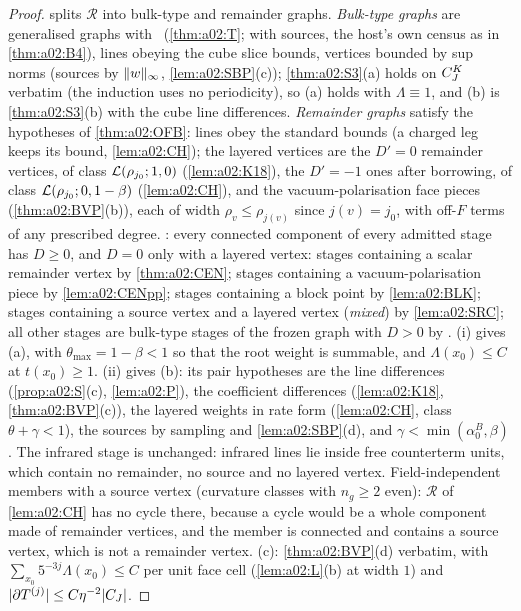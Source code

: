 \begin{proof}
 splits $\mathcal R$ into bulk-type and remainder graphs. \emph{Bulk-type graphs} are generalised graphs with \DEG\ (\cref{thm:a02:T}; with sources, the host's own census as in \cref{thm:a02:B4}), lines obeying the cube slice bounds, vertices bounded by sup norms (sources by $\lVert w\rVert_\infty$, \cref{lem:a02:SBP}(c)); \cref{thm:a02:S3}(a) holds on $C^{K}_{J}$ verbatim (the induction uses no periodicity), so (a) holds with $\Lambda\equiv1$, and (b) is \cref{thm:a02:S3}(b) with the cube line differences. \emph{Remainder graphs} satisfy the hypotheses of \cref{thm:a02:OFB}: lines obey the standard bounds (a charged leg keeps its bound, \cref{lem:a02:CH}); the layered vertices are the $D'=0$ remainder vertices, of class $\mathcal L(\rho_{j_0};1,0)$ (\cref{lem:a02:K18}), the $D'=-1$ ones after borrowing, of class $\mathcal L(\rho_{j_0};0,1-\beta)$ (\cref{lem:a02:CH}), and the vacuum-polarisation face pieces (\cref{thm:a02:BVP}(b)), each of width $\rho_v\le\rho_{j(v)}$ since $j(v)=j_0$, with off-$F$ terms of any prescribed degree. \DEGB: every connected component of every admitted stage has $D\ge0$, and $D=0$ only with a layered vertex: stages containing a scalar remainder vertex by \cref{thm:a02:CEN}; stages containing a vacuum-polarisation piece by \cref{lem:a02:CENpp}; stages containing a block point by \cref{lem:a02:BLK}; stages containing a source vertex and a layered vertex (\emph{mixed}) by \cref{lem:a02:SRC}; all other stages are bulk-type stages of the frozen graph with $D>0$ by \DEG. (i) gives (a), with $\theta_{\max}=1-\beta<1$ so that the root weight is summable, and $\Lambda(x_0)\le C$ at $t(x_0)\ge1$. (ii) gives (b): its pair hypotheses are the line differences (\cref{prop:a02:S}(c), \cref{lem:a02:P}), the coefficient differences (\cref{lem:a02:K18}, \cref{thm:a02:BVP}(c)), the layered weights in rate form (\cref{lem:a02:CH}, class $\theta+\gamma<1$), the sources by sampling and \cref{lem:a02:SBP}(d), and $\gamma<\min(\alpha_0^B,\beta)$. The infrared stage is unchanged: infrared lines lie inside free counterterm units, which contain no remainder, no source and no layered vertex. Field-independent members with a source vertex (curvature classes with $n_g\ge2$ even): $\mathcal R$ of \cref{lem:a02:CH} has no cycle there, because a cycle would be a whole component made of remainder vertices, and the member is connected and contains a source vertex, which is not a remainder vertex. (c): \cref{thm:a02:BVP}(d) verbatim, with $\sum_{x_0}5^{-3j}\Lambda(x_0)\le C$ per unit face cell (\cref{lem:a02:L}(b) at width $1$) and $|\partial T^{(j)}|\le C\eta^{-2}|C_J|$.
\end{proof}

